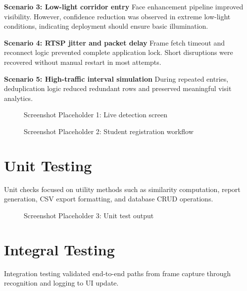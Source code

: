 \documentclass{fisatprojectfinal}
\begin{document}
\textbf{Scenario 3: Low-light corridor entry}\newline
Face enhancement pipeline improved visibility. However, confidence reduction was observed in extreme low-light conditions, indicating deployment should ensure basic illumination.

\textbf{Scenario 4: RTSP jitter and packet delay}\newline
Frame fetch timeout and reconnect logic prevented complete application lock. Short disruptions were recovered without manual restart in most attempts.

\textbf{Scenario 5: High-traffic interval simulation}\newline
During repeated entries, deduplication logic reduced redundant rows and preserved meaningful visit analytics.

\begin{figure}[h!]
	\begin{center}
		\fbox{\rule{0pt}{2.4in}\rule{0.85\linewidth}{0pt}}
		\caption{Screenshot Placeholder 1: Live detection screen}
	\end{center}
\end{figure}

\begin{figure}[h!]
	\begin{center}
		\fbox{\rule{0pt}{2.4in}\rule{0.85\linewidth}{0pt}}
		\caption{Screenshot Placeholder 2: Student registration workflow}
	\end{center}
\end{figure}

\section{Unit Testing}
Unit checks focused on utility methods such as similarity computation, report generation, CSV export formatting, and database CRUD operations.

\begin{figure}[h!]
	\begin{center}
		\fbox{\rule{0pt}{2.4in}\rule{0.85\linewidth}{0pt}}
		\caption{Screenshot Placeholder 3: Unit test output}
	\end{center}
\end{figure}

\section{Integral Testing}
Integration testing validated end-to-end paths from frame capture through recognition and logging to UI update.
\end{document}
